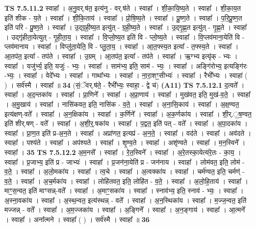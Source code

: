 \documentclass[17pt]{extarticle}
\begin{document}
                  \newline
                                \textbf{ TS 7.5.11.2} \newline
                  स्वाहा᳚ । अ॒नु॒वर्.ष॑त॒ इत्य॑नु - वर्.ष॑ते । स्वाहा᳚ । शी॒का॒यि॒ष्य॒ते । स्वाहा᳚ । शी॒का॒य॒त इति॑ शीक - य॒ते । स्वाहा᳚ । शी॒कि॒ताय॑ । स्वाहा᳚ । प्रो॒षि॒ष्य॒ते । स्वाहा᳚ । प्रु॒ष्ण॒ते । स्वाहा᳚ । प॒रि॒प्रु॒ष्ण॒त इति॑ परि - प्रु॒ष्ण॒ते । स्वाहा᳚ । उ॒द्ग्र॒ही॒ष्य॒त इत्यु॑त् - ग्र॒ही॒ष्य॒ते । स्वाहा᳚ । उ॒द्गृ॒ह्ण॒त इत्यु॑त् - गृ॒ह्ण॒ते । स्वाहा᳚ । उद्गृ॑हीता॒येत्युत् -   गृ॒ही॒ता॒य॒ । स्वाहा᳚ । वि॒प्लो॒ष्य॒त इति॑ वि - प्लो॒ष्य॒ते । स्वाहा᳚ । वि॒प्लव॑माना॒येति॑ वि - प्लव॑मानाय । स्वाहा᳚ । विप्लु॑ता॒येति॒ वि - प्लु॒ता॒य॒ । स्वाहा᳚ । आ॒त॒फ्स्य॒त इत्या᳚ - त॒फ्स्य॒ते । स्वाहा᳚ । आ॒तप॑त॒ इत्या᳚ - तप॑ते । स्वाहा᳚ । उ॒ग्रम् । आ॒तप॑त॒ इत्या᳚ - तप॑ते । स्वाहा᳚ । ऋ॒ग्भ्य इत्यृ॑क् - भ्यः । स्वाहा᳚ । यजु॑र्भ्य॒ इति॒ यजुः॑ - भ्यः॒ । स्वाहा᳚ । साम॑भ्य॒ इति॒ साम॑ - भ्यः॒ । स्वाहा᳚ । अङ्गि॑रोभ्य॒ इत्यङ्गि॑रः -भ्यः॒ । स्वाहा᳚ । वेदे᳚भ्यः । स्वाहा᳚ । गाथा᳚भ्यः । स्वाहा᳚ । ना॒रा॒शꣳ॒॒सीभ्यः॑ । स्वाहा᳚ । रैभी᳚भ्यः । स्वाहा॑ ( ) । सर्व॑स्मै । स्वाहा᳚ ॥ \textbf{  34} \newline
                  \newline
                      (सं॒ॅवर्.ष॑ते॒ - रैभी᳚भ्यः॒ स्वाहा॒ - द्वे च॑)  \textbf{(A11)} \newline \newline
                                \textbf{ TS 7.5.12.1} \newline
                  द॒त्वते᳚ । स्वाहा᳚ । अ॒द॒न्तका॑य । स्वाहा᳚ । प्रा॒णिने᳚ । स्वाहा᳚ । अ॒प्रा॒णाय॑ । स्वाहा᳚ । मुख॑वत॒ इति॒ मुख॑-व॒ते॒ । स्वाहा᳚ । अ॒मु॒खाय॑ । स्वाहा᳚ । नासि॑कवत॒ इति॒ नासि॑क - व॒ते॒ । स्वाहा᳚ । अ॒ना॒सि॒काय॑ । स्वाहा᳚ । अ॒क्ष॒ण्वत॒ इत्य॑क्षण्-वते᳚ । स्वाहा᳚ । अ॒न॒क्षिका॑य । स्वाहा᳚ । क॒र्णिने᳚ । स्वाहा᳚ । अ॒क॒र्णका॑य । स्वाहा᳚ । शी॒र्.॒ष॒ण्वत॒ इति॑ शीर्.षण् - वते᳚ । स्वाहा᳚ । अ॒शी॒र्॒.षका॑य । स्वाहा᳚ । प॒द्वत॒ इति॑ पत् - वते᳚ । स्वाहा᳚ । अ॒पा॒दका॑य । स्वाहा᳚ । प्रा॒ण॒त इति॑ प्र-अ॒न॒ते । स्वाहा᳚ । अप्रा॑णत॒ इत्यप्र॑ - अ॒न॒ते॒ । स्वाहा᳚ । वद॑ते । स्वाहा᳚ । अव॑दते । स्वाहा᳚ । पश्य॑ते । स्वाहा᳚ । अप॑श्यते । स्वाहा᳚ । शृ॒ण्व॒ते । स्वाहा᳚ । अशृ॑ण्वते । स्वाहा᳚ । म॒न॒स्विने᳚ । स्वाहा᳚ । \textbf{  35} \newline
                  \newline
                                \textbf{ TS 7.5.12.2} \newline
                  अ॒म॒नसे᳚ । स्वाहा᳚ । रे॒त॒स्विने᳚ । स्वाहा᳚ । अ॒रे॒तस्का॒येत्य॑रे॒तः - का॒य॒ । स्वाहा᳚ । प्र॒जाभ्य॒ इति॑ प्र - जाभ्यः॑ । स्वाहा᳚ । प्र॒जन॑ना॒येति॑ प्र - जन॑नाय । स्वाहा᳚ । लोम॑वत॒ इति॒ लोम॑ - व॒ते॒ । स्वाहा᳚ । अ॒लो॒मका॑य । स्वाहा᳚ । त्व॒चे । स्वाहा᳚ । अ॒त्वक्का॑य । स्वाहा᳚ । चर्म॑ण्वत॒ इति॒ चर्मण्॑ -   व॒ते॒ । स्वाहा᳚ । अ॒च॒र्मका॑य । स्वाहा᳚ । लोहि॑तवत॒ इति॒ लोहि॑त - व॒ते॒ । स्वाहा᳚ । अ॒लो॒हि॒ताय॑ । स्वाहा᳚ । माꣳ॒॒स॒न्वत॒ इति॑ माꣳसन्न्-वते᳚ । स्वाहा᳚ । अ॒माꣳ॒॒सका॑य । स्वाहा᳚ । स्नाव॑भ्य॒ इति॒ स्नाव॑ - भ्यः॒ । स्वाहा᳚ । अ॒स्ना॒वका॑य । स्वाहा᳚ । अ॒स्थ॒न्वत॒ इत्य॑स्थन्न् - वते᳚ । स्वाहा᳚ । अ॒न॒स्थिका॑य । स्वाहा᳚ । म॒ज्ज॒न्वत॒ इति॑ मज्जन्न् - वते᳚ । स्वाहा᳚ । अ॒म॒ज्जका॑य । स्वाहा᳚ । अ॒ङ्गिने᳚ । स्वाहा᳚ । अ॒न॒ङ्गाय॑ । स्वाहा᳚ । आ॒त्मने᳚ । स्वाहा᳚ । अना᳚त्मने । स्वाहा᳚ ( ) । सर्व॑स्मै । स्वाहा᳚ ॥ \textbf{  36} \newline
\end{document}

